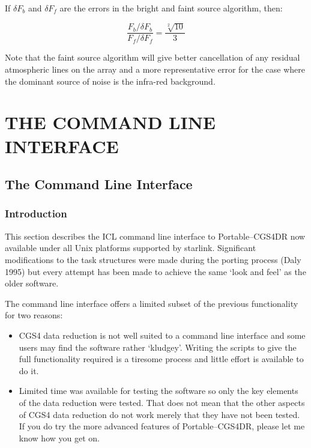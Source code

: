 \documentclass[a4paper]{book}
\newcommand{\stardocinitials}  {SUN}
\newcommand{\stardocnumber}    {27.5}
\newcommand{\stardocname}{\stardocinitials /\stardocnumber}
\renewcommand{\_}{{\tt\char'137}}
\begin{document}
If $\delta F_{b}$ and $\delta F_{f}$ are the errors in the bright and faint
source algorithm, then:

\begin{equation}
  \frac{F_{b} / \delta F_{b}}{F_{f} / \delta F_{f}} = \frac{\sqrt[2]{10}}{3}
\label{equation_10}
\end{equation}

Note that the faint source algorithm will give better cancellation of any
residual atmospheric lines on the array and a more representative error
for the case where the dominant source of noise is the infra-red
background.

\part{THE COMMAND LINE INTERFACE}
\pagestyle{myheadings}
\markboth{ICL Interface}{\stardocname}

\chapter{The Command Line Interface}
\section{Introduction}
This section describes the ICL command line interface to
Portable--CGS4DR now available under all Unix platforms supported by
{\sc starlink}. Significant modifications to the task structures were made
during the porting process (Daly 1995) but every attempt has been made to achieve the
same `look and feel' as the older software.

The command line interface offers a limited subset of the previous
functionality for two reasons:

\begin{itemize}
\item CGS4 data reduction is not well suited to a command line interface
      and some users may find the software rather `kludgey'.
      Writing the scripts to give the full functionality required is a
      tiresome process and little effort is available to do it.
\item Limited time was available for testing the software so only the key
      elements of the data reduction were tested. That does not mean that the
      other aspects of CGS4 data reduction do not work merely that they have
      not been tested. If you do try the more advanced features of Portable--CGS4DR,
      please let me know how you get on.
\end{itemize}
\end{document}
